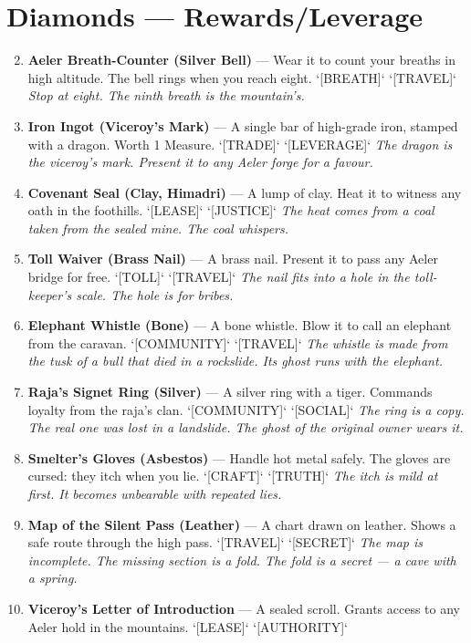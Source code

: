 \section*{Diamonds --- Rewards/Leverage}
\label{sec:satrapies-rewards}
\begin{enumerate}
\setcounter{enumi}{1}
\item \textbf{Aeler Breath-Counter (Silver Bell)} --- Wear it to count your breaths in high altitude. The bell rings when you reach eight. `[BREATH]` `[TRAVEL]`
  \hfill \textit{Stop at eight. The ninth breath is the mountain's.}
\item \textbf{Iron Ingot (Viceroy's Mark)} --- A single bar of high-grade iron, stamped with a dragon. Worth 1 Measure. `[TRADE]` `[LEVERAGE]`
  \hfill \textit{The dragon is the viceroy's mark. Present it to any Aeler forge for a favour.}
\item \textbf{Covenant Seal (Clay, Himadri)} --- A lump of clay. Heat it to witness any oath in the foothills. `[LEASE]` `[JUSTICE]`
  \hfill \textit{The heat comes from a coal taken from the sealed mine. The coal whispers.}
\item \textbf{Toll Waiver (Brass Nail)} --- A brass nail. Present it to pass any Aeler bridge for free. `[TOLL]` `[TRAVEL]`
  \hfill \textit{The nail fits into a hole in the toll-keeper's scale. The hole is for bribes.}
\item \textbf{Elephant Whistle (Bone)} --- A bone whistle. Blow it to call an elephant from the caravan. `[COMMUNITY]` `[TRAVEL]`
  \hfill \textit{The whistle is made from the tusk of a bull that died in a rockslide. Its ghost runs with the elephant.}
\item \textbf{Raja's Signet Ring (Silver)} --- A silver ring with a tiger. Commands loyalty from the raja's clan. `[COMMUNITY]` `[SOCIAL]`
  \hfill \textit{The ring is a copy. The real one was lost in a landslide. The ghost of the original owner wears it.}
\item \textbf{Smelter's Gloves (Asbestos)} --- Handle hot metal safely. The gloves are cursed: they itch when you lie. `[CRAFT]` `[TRUTH]`
  \hfill \textit{The itch is mild at first. It becomes unbearable with repeated lies.}
\item \textbf{Map of the Silent Pass (Leather)} --- A chart drawn on leather. Shows a safe route through the high pass. `[TRAVEL]` `[SECRET]`
  \hfill \textit{The map is incomplete. The missing section is a fold. The fold is a secret — a cave with a spring.}
\item \textbf{Viceroy's Letter of Introduction} --- A sealed scroll. Grants access to any Aeler hold in the mountains. `[LEASE]` `[AUTHORITY]`

\end{enumerate}
